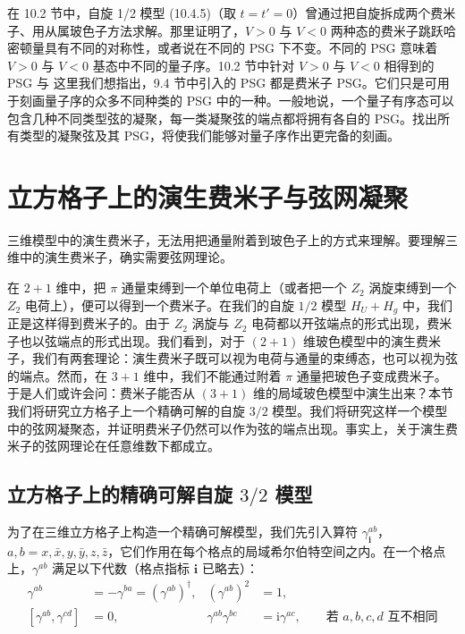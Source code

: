 在 10.2 节中，自旋 1/2 模型 (10.4.5)（取 $t=t'=0$）曾通过把自旋拆成两个费米子、用从属玻色子方法求解。那里证明了，$V>0$ 与 $V<0$ 两种态的费米子跳跃哈密顿量具有不同的对称性，或者说在不同的 PSG 下不变。不同的 PSG 意味着 $V>0$ 与 $V<0$ 基态中不同的量子序。10.2 节中针对 $V>0$ 与 $V<0$ 相得到的 PSG 与
这里我们想指出，9.4 节中引入的 PSG 都是费米子 PSG。它们只是可用于刻画量子序的众多不同种类的 PSG 中的一种。一般地说，一个量子有序态可以包含几种不同类型弦的凝聚，每一类凝聚弦的端点都将拥有各自的 PSG。找出所有类型的凝聚弦及其 PSG，将使我们能够对量子序作出更完备的刻画。

\section{立方格子上的演生费米子与弦网凝聚}

\begin{keypoints}
\item 三维模型中的演生费米子，无法用把通量附着到玻色子上的方式来理解。要理解三维中的演生费米子，确实需要弦网理论。
\end{keypoints}

在 $2+1$ 维中，把 $\pi$ 通量束缚到一个单位电荷上（或者把一个 $Z_2$ 涡旋束缚到一个 $Z_2$ 电荷上），便可以得到一个费米子。在我们的自旋 $1/2$ 模型 $H_U+H_g$ 中，我们正是这样得到费米子的。由于 $Z_2$ 涡旋与 $Z_2$ 电荷都以开弦端点的形式出现，费米子也以弦端点的形式出现。我们看到，对于 $(2+1)$ 维玻色模型中的演生费米子，我们有两套理论：演生费米子既可以视为电荷与通量的束缚态，也可以视为弦的端点。然而，在 $3+1$ 维中，我们不能通过附着 $\pi$ 通量把玻色子变成费米子。于是人们或许会问：费米子能否从 $(3+1)$ 维的局域玻色模型中演生出来？本节我们将研究立方格子上一个精确可解的自旋 $3/2$ 模型。我们将研究这样一个模型中的弦网凝聚态，并证明费米子仍然可以作为弦的端点出现。事实上，关于演生费米子的弦网理论在任意维数下都成立。

\subsection{立方格子上的精确可解自旋 $3/2$ 模型}

为了在三维立方格子上构造一个精确可解模型，我们先引入算符 $\gamma_{\pmb{i}}^{ab}$，$a,b=x,\bar{x},y,\bar{y},z,\bar{z}$，它们作用在每个格点的局域希尔伯特空间之内。在一个格点上，$\gamma^{ab}$ 满足以下代数（格点指标 $\pmb{i}$ 已略去）：
\begin{align*}
\gamma^{ab}&=-\gamma^{ba}=(\gamma^{ab})^{\dagger}, & (\gamma^{ab})^{2}&=1, \tag{10.5.1}\\
[\gamma^{ab},\gamma^{cd}]&=0, & \gamma^{ab}\gamma^{bc}&=\mathrm{i}\gamma^{ac}, \qquad \text{若 } a,b,c,d \text{ 互不相同}
\end{align*}

